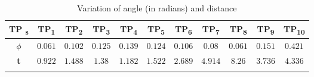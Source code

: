 \documentclass{scrartcl}
\begin{document}
\begin{table}
  \caption{Variation of angle (in radians) and distance}
  \label{table:variation}
  \centering
  \begin{tabular}{c|c @{\hskip 0.2cm} c @{\hskip 0.2cm} c @{\hskip 0.2cm} c @{\hskip 0.2cm} c @{\hskip 0.2cm} c @{\hskip 0.2cm} c @{\hskip 0.2cm} c @{\hskip 0.2cm} c @{\hskip 0.2cm} c} 
  
    \midrule\noalign{\smallskip}
    \textbf{TP \textsubscript{s}} & \textbf{TP\textsubscript{1}} & \textbf{TP\textsubscript{2}} & \textbf{TP\textsubscript{3}} & \textbf{TP\textsubscript{4}} & \textbf{TP\textsubscript{5}} & \textbf{TP\textsubscript{6}} & \textbf{TP\textsubscript{7}} & \textbf{TP\textsubscript{8}} & \textbf{TP\textsubscript{9}} & \textbf{TP\textsubscript{10}} \\
    \hline\noalign{\smallskip}  
  
    $\phi$ & $0.061$ & $0.102$ & $0.125$ & $0.139$ & $0.124$ & $0.106$ & $0.08$ & $0.061$ & $0.151$ & $0.421$ \\
    
    \hline\noalign{\smallskip}
    \textbf{t} & $0.922$ & $1.488$ & $1.38$ & $1.182$ & $1.522$ & $2.689$ & $4.914$ & $8.26$ & $3.736$ & $4.336$ \\ 

    \midrule\noalign{\smallskip}
  \end{tabular}
\end{table}
\end{document}
